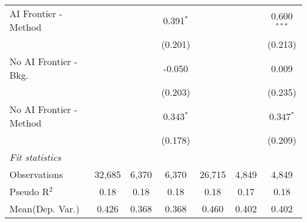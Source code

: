 \begin{tabular}{lcccccc}
   AI Frontier - Method    &               &               & 0.391$^{*}$   &               &               & 0.600$^{***}$\\   
                           &               &               & (0.201)       &               &               & (0.213)\\   
   No AI Frontier - Bkg.   &               &               & -0.050        &               &               & 0.009\\   
                           &               &               & (0.203)       &               &               & (0.235)\\   
   No AI Frontier - Method &               &               & 0.343$^{*}$   &               &               & 0.347$^{*}$\\   
                           &               &               & (0.178)       &               &               & (0.209)\\   
   \midrule
   \emph{Fit statistics}\\
   Observations            & 32,685        & 6,370         & 6,370         & 26,715        & 4,849         & 4,849\\  
   Pseudo R$^2$            & 0.18          & 0.18          & 0.18          & 0.18          & 0.17          & 0.18\\  
Mean(Dep. Var.) & 0.426 & 0.368 & 0.368 & 0.460 & 0.402 & 0.402 \\
   

\end{tabular}
